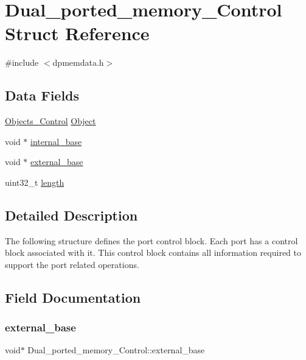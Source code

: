 \hypertarget{structDual__ported__memory__Control}{}\section{Dual\+\_\+ported\+\_\+memory\+\_\+\+Control Struct Reference}
\label{structDual__ported__memory__Control}


{\ttfamily \#include $<$dpmemdata.\+h$>$}

\subsection*{Data Fields}
\begin{DoxyCompactItemize}
\item 
\mbox{\hyperlink{structObjects__Control}{Objects\+\_\+\+Control}} \mbox{\hyperlink{structDual__ported__memory__Control_a52ad1d36772556927bb8adce7a4f48c7}{Object}}
\item 
void $\ast$ \mbox{\hyperlink{structDual__ported__memory__Control_acfa175da8646778f6378d73fd8cde64e}{internal\+\_\+base}}
\item 
void $\ast$ \mbox{\hyperlink{structDual__ported__memory__Control_ab5d95ef3effed6155547d46c9d69bdbb}{external\+\_\+base}}
\item 
uint32\+\_\+t \mbox{\hyperlink{structDual__ported__memory__Control_ab03759c098745dfcb8e4f50664b7301e}{length}}
\end{DoxyCompactItemize}


\subsection{Detailed Description}
The following structure defines the port control block. Each port has a control block associated with it. This control block contains all information required to support the port related operations. 

\subsection{Field Documentation}
\mbox{\label{structDual__ported__memory__Control_ab5d95ef3effed6155547d46c9d69bdbb}} 
\subsubsection{\texorpdfstring{external\_base}{external\_base}}
{\footnotesize\ttfamily void$\ast$ Dual\+\_\+ported\+\_\+memory\+\_\+\+Control\+::external\+\_\+base}

